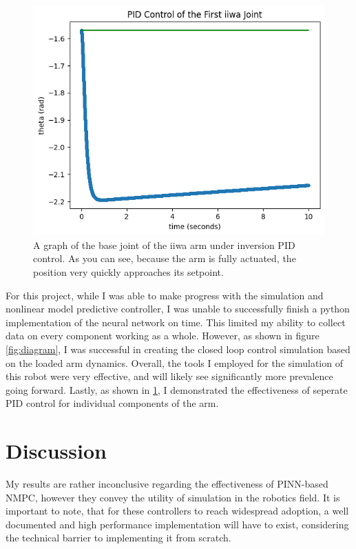 \documentclass[11pt, titlepage]{article}
\begin{document}
\begin{figure}[hbt!]
\centering
\includegraphics[width=0.5\linewidth]{pid.png}
\caption{\label{fig:pid}A graph of the base joint of the iiwa arm under inversion PID control. As you can see, because the arm is fully actuated, the position very quickly approaches its setpoint.}
\end{figure}

For this project, while I was able to make progress with the simulation and nonlinear model predictive controller, I was unable to successfully finish a python implementation of the neural network on time. This limited my ability to collect data on every component working as a whole. However, as shown in figure \ref{fig:diagram}, I was successful in creating the closed loop control simulation based on the loaded arm dynamics. Overall, the tools I employed for the simulation of this robot were very effective, and will likely see significantly more prevalence going forward. Lastly, as shown in \ref{fig:pid}, I demonstrated the effectiveness of seperate PID control for individual components of the arm.

\section{Discussion}

My results are rather inconclusive regarding the effectiveness of PINN-based NMPC, however they convey the utility of simulation in the robotics field. It is important to note, that for these controllers to reach widespread adoption, a well documented and high performance implementation will have to exist, considering the technical barrier to implementing it from scratch.

\printbibliography
\end{document}
